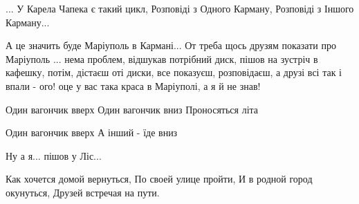 ... У Карела Чапека є такий цикл, Розповіді з Одного Карману, Розповіді з
Іншого Карману...

А це значить буде Маріуполь в Кармані... От треба щось друзям показати про
Маріуполь ...  нема проблем, відшукав потрібний диск, пішов на зустріч в
кафешку, потім, дістаєш оті диски, все показуєш, розповідаєш, а друзі всі так і
впали - ого! оце у вас така краса в Маріуполі, а я й не знав!







Один вагончик вверх
Один вагончик вниз
Проносяться літа

Один вагончик вверх
А інший - їде вниз

Ну а я... пішов у Ліс...






Как  хочется  домой   вернуться, По  своей  улице  пройти, И  в  родной   город  окунуться, Друзей  встречая  на  пути.


